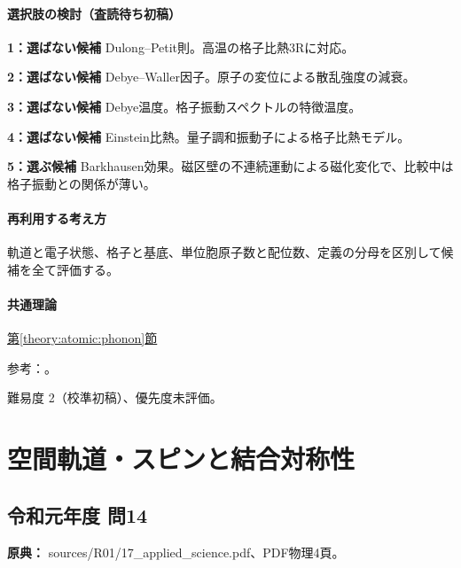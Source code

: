 \paragraph{選択肢の検討（査読待ち初稿）}\mbox{}\par

\noindent\textbf{1：選ばない候補} Dulong–Petit則。高温の格子比熱3Rに対応。\par

\noindent\textbf{2：選ばない候補} Debye–Waller因子。原子の変位による散乱強度の減衰。\par

\noindent\textbf{3：選ばない候補} Debye温度。格子振動スペクトルの特徴温度。\par

\noindent\textbf{4：選ばない候補} Einstein比熱。量子調和振動子による格子比熱モデル。\par

\noindent\textbf{5：選ぶ候補} Barkhausen効果。磁区壁の不連続運動による磁化変化で、比較中は格子振動との関係が薄い。\par

\paragraph{再利用する考え方} 軌道と電子状態、格子と基底、単位胞原子数と配位数、定義の分母を区別して候補を全て評価する。

\paragraph{共通理論} \hyperref[theory:atomic:phonon]{第\ref*{theory:atomic:phonon}節}

\par 参考：\cite{atomic_phonon,atomic_barkhausen}。

\par 難易度 2（校準初稿）、優先度未評価。

\section{空間軌道・スピンと結合対称性}

\subsection{令和元年度 問14}
\label{q:r01-reg-applied-14}

\noindent\textbf{原典：} sources/R01/17\_applied\_science.pdf、PDF物理4頁。

